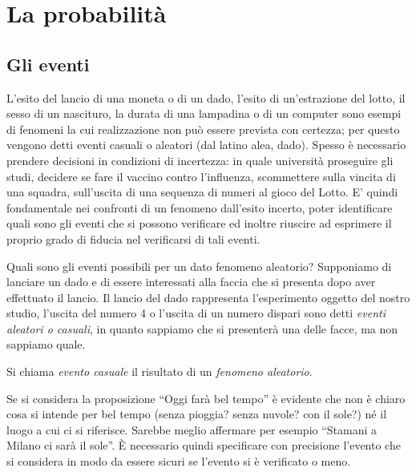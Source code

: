 
\chapter{La probabilità}

\section{Gli eventi}
\label{sec:09_eventi}

L'esito del lancio di una moneta o di un dado, l'esito di un'estrazione del 
lotto, il sesso di un nascituro, la durata di una lampadina o di un computer 
sono esempi di fenomeni la cui realizzazione non può essere prevista con 
certezza; per questo vengono detti eventi casuali o aleatori (dal latino alea, 
dado). Spesso è necessario prendere decisioni in condizioni di incertezza: in 
quale università proseguire gli studi, decidere se fare il vaccino contro 
l'influenza, scommettere sulla vincita di una squadra, sull'uscita di una 
sequenza di numeri al gioco del Lotto. E' quindi fondamentale nei confronti di 
un fenomeno dall'esito incerto, poter identificare quali sono gli eventi che si 
possono verificare ed inoltre riuscire ad esprimere il proprio grado di fiducia 
nel verificarsi di tali eventi.

Quali sono gli eventi possibili per un dato fenomeno aleatorio? Supponiamo di 
lanciare un dado e di essere interessati alla faccia che si presenta dopo aver 
effettuato il lancio. Il lancio del dado rappresenta l'esperimento oggetto del 
nostro studio, l'uscita del numero 4 o l'uscita di un numero dispari sono detti 
\emph{eventi aleatori o casuali}, in quanto sappiamo che si presenterà una delle 
facce, ma non sappiamo quale.

\begin{definizione}
Si chiama \emph{evento casuale} il risultato di un \emph{fenomeno aleatorio}.
\end{definizione}

Se si considera la proposizione ``Oggi farà bel tempo'' è evidente che non è 
chiaro cosa si intende per bel tempo (senza pioggia? senza nuvole? con il sole?) 
né il luogo a cui ci si riferisce. Sarebbe meglio affermare per esempio 
``Stamani a Milano ci sarà il sole''. È necessario quindi specificare con 
precisione l'evento che si considera in modo da essere sicuri se l'evento si è 
verificato o meno.

